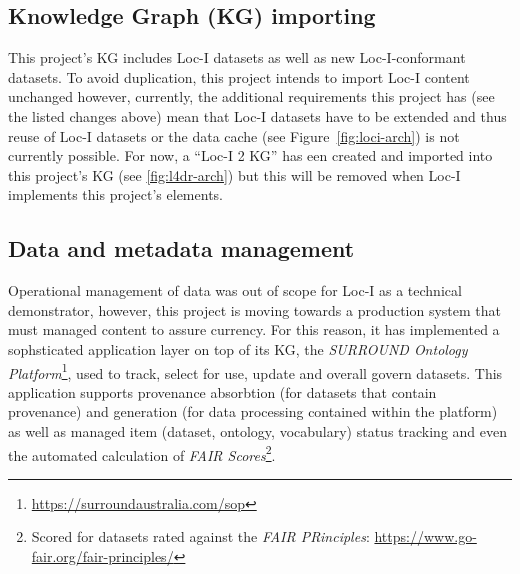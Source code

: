 \documentclass[runningheads]{llncs}
\begin{document}
\subsection{Knowledge Graph (KG) importing}
This project's KG includes Loc-I datasets as well as new Loc-I-conformant datasets. To avoid duplication, this project intends to import Loc-I content unchanged however, 
currently, the additional requirements this project has (see the listed changes above) mean that Loc-I datasets have to be extended and thus reuse of Loc-I datasets
or the data cache (see Figure~\ref{fig:loci-arch}) is not currently possible. For now, a ``Loc-I 2 KG'' has een created and imported into this project's KG (see 
\ref{fig:l4dr-arch}) but this will be removed when Loc-I implements this project's elements.

\subsection{Data and metadata management}
Operational management of data was out of scope for Loc-I as a technical demonstrator, however, this project
is moving towards a production system that must managed content to assure currency. For this reason, it has implemented a sophsticated application layer on top of its KG, the 
\textit{SURROUND Ontology Platform}\footnote{\url{https://surroundaustralia.com/sop}},  used to track, select for use, update and overall govern datasets. This application
supports provenance absorbtion (for datasets that contain provenance) and generation (for data processing contained within the platform) as well as managed item (dataset, ontology, vocabulary)
status tracking and even the automated calculation of \textit{FAIR Scores}\footnote{Scored for datasets rated against the \textit{FAIR PRinciples}: \url{https://www.go-fair.org/fair-principles/}}.
\end{document}
